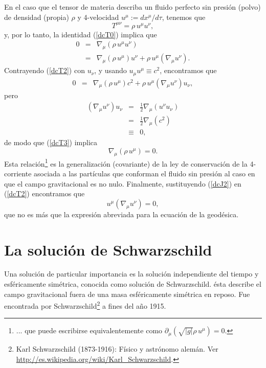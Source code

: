 En el caso que el tensor de materia describa un fluido perfecto sin presión
(polvo) de densidad (propia) $\rho$ y 4-velocidad
$u^\mu:={dx^\mu}/{d\tau}$, tenemos que
\begin{equation}
 T^{\mu\nu}=\rho\,u^\mu u^\nu,
\end{equation}
y, por lo tanto, la identidad (\ref{dcT0}) implica que
\begin{eqnarray}
 0&=&\nabla_\mu(\rho\,u^\mu u^\nu) \\
&=& \nabla_\mu(\rho\,u^\mu) u^\nu+ \rho\,u^\mu(\nabla_\mu u^\nu). \label{dcT2}
\end{eqnarray}
Contrayendo (\ref{dcT2}) con $u_\nu$, y usando $u_\mu u^\mu\equiv c^2$,
encontramos que
\begin{eqnarray}
 0&=&\nabla_\mu(\rho\,u^\mu) c^2+ \rho\,u^\mu(\nabla_\mu u^\nu)u_\nu,
\label{dcT3}
\end{eqnarray}
pero
\begin{eqnarray}
(\nabla_\mu u^\nu)u_\nu&=&\frac{1}{2}\nabla_\mu(u^\nu u_\nu)\\
&=&\frac{1}{2}\nabla_\mu(c^2) \\
&\equiv& 0,
\end{eqnarray}
de modo que (\ref{dcT3}) implica
\begin{equation}
 \nabla_\mu(\rho\,u^\mu)=0. \label{dcJ2}
\end{equation}
Esta relación\footnote{... que puede escribirse equivalentemente como $\partial_\mu(\sqrt{|g|}\rho\,u^\mu)=0$.} es la generalización (covariante) de la ley de conservación de
la 4-corriente asociada a las partículas que conforman el fluido sin presión
al caso en que el campo gravitacional es no nulo. Finalmente, sustituyendo
(\ref{dcJ2}) en (\ref{dcT2}) encontramos que
\begin{equation}
 u^\mu(\nabla_\mu u^\nu)=0,
\end{equation}
que no es más que la expresión abreviada para la ecuación de la geodésica.


\section{La solución de Schwarzschild}\label{solucion_sch}

Una solución de particular importancia es la solución
independiente del tiempo y esféricamente simétrica, conocida como solución de
Schwarzschild. ésta describe el campo gravitacional fuera de una masa
esféricamente simétrica en reposo. Fue encontrada por Schwarzschild\footnote{Karl
Schwarzschild (1873-1916): Físico y astrónomo alemán. Ver
\url{http://es.wikipedia.org/wiki/Karl\_Schwarzschild}.} a fines del año 1915.


